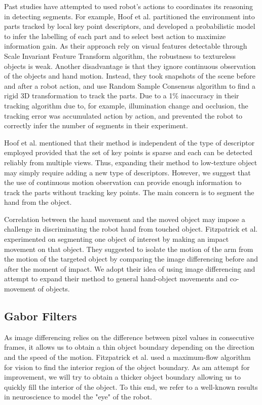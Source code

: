\documentclass{article}
\begin{document}
Past studies have attempted to used robot's actions to coordinates its reasoning in detecting segments. For example, Hoof et al. \cite{herke} partitioned the environment into parts tracked by local key point descriptors, and developed a probabilistic model to infer the labelling of each part and to select best action to maximize information gain. As their approach rely on visual features detectable through Scale Invariant Feature Transform algorithm, the robustness to textureless objects is weak. Another disadvantage is that they ignore continuous observation of the objects and hand motion. Instead, they took snapshots of the scene before and after a robot action, and use Random Sample Consensus algorithm to find a rigid 3D transformation to track the parts. Due to a 1\% inaccuracy in their tracking algorithm due to, for example, illumination change and occlusion, the tracking error was accumulated action by action, and prevented the robot to correctly infer the number of segments in their experiment. 

Hoof et al. mentioned that their method is independent of the type of descriptor employed provided that the set of key points is sparse and each can be detected reliably from multiple views. Thus, expanding their method to low-texture object may simply require adding a new type of descriptors. However, we suggest that the use of continuous motion observation can provide enough information to track the parts without tracking key points. The main concern is to segment the hand from the object.

Correlation between the hand movement and the moved object may impose a challenge in discriminating the robot hand from touched object. Fitzpatrick et al. \cite{max-flow} experimented on segmenting one object of interest by making an impact movement on that object. They suggested to isolate the motion of the arm from the motion of the targeted object by comparing the image differencing before and after the moment of impact. We adopt their idea of using image differencing and attempt to expand their method to general hand-object movements and co-movement of objects.

\subsection{Gabor Filters}

As image differencing relies on the difference between pixel values in consecutive frames, it allows us to obtain a thin object boundary depending on the direction and the speed of the motion. Fitzpatrick et al. \cite{max-flow} used a maximum-flow algorithm for vision \cite{kolmo} to find the interior region of the object boundary. As am attempt for improvement, we will try to obtain a thicker object boundary allowing us to quickly fill the interior of the object. To this end, we refer to a well-known results in neuroscience to model the "eye" of the robot. 
\end{document}
